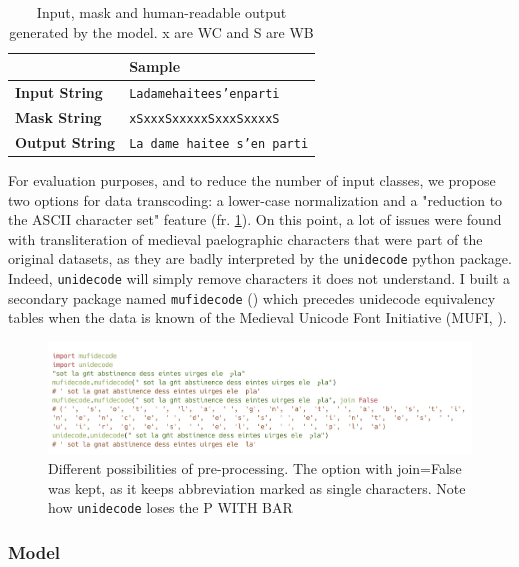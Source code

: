 \documentclass{jdmdh}
\begin{document}
\begin{table}
\centering
\begin{tabular}{@{}ll@{}}
\hline
                       & \textbf{Sample}           \\  \hline
\textbf{Input  String} & \texttt{Ladamehaitees'enparti}     \\
\textbf{Mask   String} & \texttt{xSxxxSxxxxxSxxxSxxxxS}     \\
\textbf{Output String} & \texttt{La dame haitee s'en parti} \\ \hline
\end{tabular}
  \caption{Input, mask and human-readable output generated by the model. x are WC and S are WB}
  \label{lst:input_output_example}
\end{table}

For evaluation purposes, and to reduce the number of input classes, we propose two options for data transcoding: a lower-case normalization and a "reduction to the ASCII character set" feature (fr. \ref{fig:normalization}). On this point, a lot of issues were found with transliteration of medieval paelographic characters that were part of the original datasets, as they are badly interpreted by the \texttt{unidecode} python package. Indeed, \texttt{unidecode} will simply remove characters it does not understand. I built a secondary package named \texttt{mufidecode} (\citet{thibault_clerice_2019_3237731}) which precedes unidecode equivalency tables when the data is known of the Medieval Unicode Font Initiative (MUFI, \citet{mufi}).

\begin{figure}
  \centering
  \includegraphics[width=\linewidth]{carbon.png}
  \caption{Different possibilities of pre-processing. The option with join=False was kept, as it keeps abbreviation marked as single characters. Note how \texttt{unidecode} loses the P WITH BAR}
  \label{fig:normalization}
\end{figure}

\subsubsection{Model}
\end{document}
